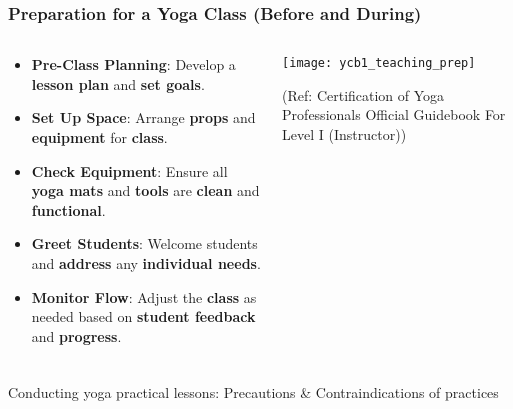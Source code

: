 \begin{frame}[fragile]\frametitle{Preparation for a Yoga Class (Before and During)}
\begin{columns}
    \begin{column}[T]{0.5\linewidth}
      \begin{itemize}
        \item \textbf{Pre-Class Planning}: Develop a \textbf{lesson plan} and \textbf{set goals}.
        \item \textbf{Set Up Space}: Arrange \textbf{props} and \textbf{equipment} for \textbf{class}.
        \item \textbf{Check Equipment}: Ensure all \textbf{yoga mats} and \textbf{tools} are \textbf{clean} and \textbf{functional}.
        \item \textbf{Greet Students}: Welcome students and \textbf{address} any \textbf{individual needs}.
        \item \textbf{Monitor Flow}: Adjust the \textbf{class} as needed based on \textbf{student feedback} and \textbf{progress}.
      \end{itemize}
    \end{column}
    \begin{column}[T]{0.5\linewidth}
        \begin{center}
        \texttt{[image: ycb1\_teaching\_prep]}
		
		{\tiny (Ref: Certification  of Yoga Professionals Official Guidebook For Level I (Instructor))}	
        \end{center}	
    \end{column}
\end{columns}
\end{frame}


\begin{frame}[fragile]\frametitle{}
\begin{center}
{\Large Conducting yoga practical lessons: Precautions \& Contraindications of practices}
\end{center}
\end{frame}

